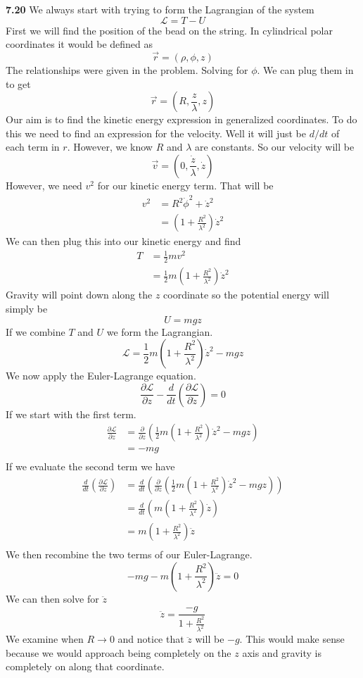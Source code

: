\documentclass[11pt, leqno]{article}
\begin{document}
\bigskip

\noindent \textbf{7.20}
We always start with trying to form the Lagrangian of the system 
$$
\mathcal{L} = T - U
$$
First we will find the position of the bead on the string. In cylindrical polar coordinates it would be defined as 
$$
\vec{r} = (\rho, \phi, z)
$$
The relationships were given in the problem. Solving for $\phi$. We can plug them in to get 
$$
\vec{r} = (R, \frac{z}{\lambda}, z) 
$$
Our aim is to find the kinetic energy expression in generalized coordinates. To do this we need to find an expression for the velocity. Well it will just be $d/dt$ of each term in $r$. However, we know $R$ and $\lambda$ are constants. So our velocity will be 
$$
\vec{v} = (0, \frac{\dot{z}}{\lambda}, \dot{z})
$$
However, we need $v^2$ for our kinetic energy term. That will be 
\begin{align*}
v^2 &= R^2 \dot{\phi}^2 + \dot{z}^2 \\
&= (1 + \frac{R^2}{\lambda^2 }) \dot{z}^2
\end{align*}
We can then plug this into our kinetic energy and find 
\begin{align*} 
T &= \frac{1}{2} m v^2 \\ 
&= \frac{1}{2} m (1 + \frac{R^2}{\lambda^2 }) \dot{z}^2
\end{align*}
Gravity will point down along the $z$ coordinate so the potential energy will simply be 
$$
U = mgz
$$
If we combine $T$ and $U$ we form the Lagrangian. 
$$
\mathcal{L} =  \frac{1}{2} m (1 + \frac{R^2}{\lambda^2 }) \dot{z}^2 - mgz 
$$
We now apply the Euler-Lagrange equation.
$$
\frac{\partial \mathcal{L}}{\partial z} - \frac{d}{dt}\left(\frac{\partial \mathcal{L}}{\partial \dot{z}}\right)= 0 
$$
If we start with the first term.
\begin{align*}
\frac{\partial\mathcal{L} }{\partial z} &= \frac{\partial}{\partial z}\left( \frac{1}{2} m (1 + \frac{R^2}{\lambda^2 }) \dot{z}^2 - mgz  \right) \\ 
&= -mg \\ 
\end{align*}
If we evaluate the second term we have 
\begin{align*}
\frac{d}{dt}\left(\frac{\partial \mathcal{L}}{\partial \dot{z}}\right) &= \frac{d}{dt}\left(\frac{\partial}{\partial \dot{z}} \left(  \frac{1}{2} m (1 + \frac{R^2}{\lambda^2 }) \dot{z}^2 - mgz \right) \right)  \\
&=  \frac{d}{dt}\left( m (1 + \frac{R^2}{\lambda^2 }) \dot{z} \right) \\ 
&= m (1 + \frac{R^2}{\lambda^2 }) \ddot{z} \\ 
\end{align*}
We then recombine the two terms of our Euler-Lagrange. 
$$ 
-mg - m (1 + \frac{R^2}{\lambda^2 }) \ddot{z} = 0
$$ 
We can then solve for $\ddot{z}$
$$
\boxed{\ddot{z} = \frac{-g}{1 + \frac{R^2}{\lambda^2}} }
$$
We examine when $R \rightarrow 0$ and notice that $\ddot{z}$ will be $-g$. This would make sense because we would approach being completely on the $z$ axis and gravity is completely on along that coordinate.  
\end{document}
